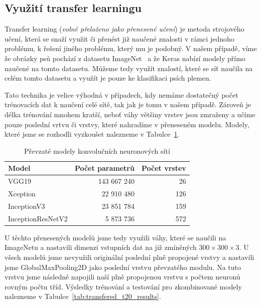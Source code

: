\documentclass[a4paper,12pt]{article}
\begin{document}
\subsection{Využití transfer learningu}
Transfer learning (\textit{volně přeloženo jako přenesené učení}) je metoda strojového učení, která se snaží využit či přenést již naučené znalosti v rámci 
jednoho problému, k řešení jiného problému, který mu je podobný. V našem případě, víme že obrázky psů pochází z datasetu ImageNet~\cite{imagenet_cvpr09} a 
že Keras nabízí modely přímo naučené na tomto datasetu. Můžeme tedy využít znalostí, které se síť naučila na celém tomto datasetu a využít je pouze 
ke klasifikaci psích plemen.

Tato technika je velice výhodná v případech, kdy nemáme dostatečný počet trénovacích dat k naučení celé sítě, tak jak je tomu v našem případě. Zároveň je 
délka trénování mnohem kratší, neboť váhy většiny vrstev jsou zmraženy a učíme pouze poslední vrtvu či vrstvy, které nahradíme v přeneseném modelu.
Modely, které jsme se rozhodli vyzkoušet nalezneme v Tabulce~\ref{tab:transfered_models}. 

\begin{table}[h!]
    \centering
    \begin{tabular}{l | r | r}
    \toprule
    Model                                       & Počet parametrů   & Počet vrstev  \\\midrule
    VGG19 \cite{vgg19}                          & 143 667 240       & 26            \\
    Xception  \cite{xception}                   & 22 910 480        & 126           \\
    InceptionV3 \cite{inceptionv3}              & 23 851 784        & 159           \\
    InceptionResNetV2 \cite{inception_resnet}   & 5 873 736         & 572           \\
    \bottomrule
    \end{tabular}
    \caption{Převzaté modely konvolučních neuronových sítí}
    \label{tab:transfered_models}
\end{table}

U těchto přenesených modelů jsme tedy využili váhy, které se naučili na ImageNetu a nastavili dimenzi vstupních dat na již zmíněných $300 \times 300 \times 3$.
U všech modelů jsme nevyužili originální poslední plně propojené vrstvy a nastavili jsme GlobalMaxPooling2D jako poslední vrstvu převzatého modulu. Na tuto vrstvu jsme následně napojili naší plně propojenou vrstvu s počtem neuronů rovným počtu tříd. Výsledky trénování a testování pro zkombinované modely nalezneme v Tabulce~\ref{tab:transfered_t20_results}.
\end{document}
